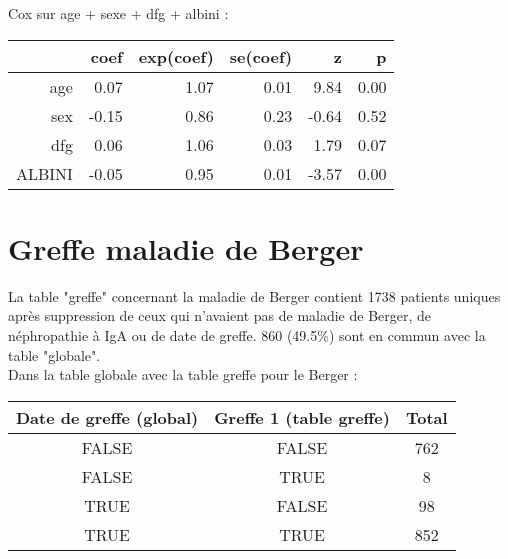 \documentclass[11pt,a4paper]{article}\usepackage[]{graphicx}\usepackage[]{color}
\begin{document}
Cox sur age + sexe + dfg + albini :
\begin{table}[H]
\centering
\begin{tabular}{rrrrrr}
  \hline
 & coef & exp(coef) & se(coef) & z & p \\ 
  \hline
age & 0.07 & 1.07 & 0.01 & 9.84 & 0.00 \\ 
  sex & -0.15 & 0.86 & 0.23 & -0.64 & 0.52 \\ 
  dfg & 0.06 & 1.06 & 0.03 & 1.79 & 0.07 \\ 
  ALBINI & -0.05 & 0.95 & 0.01 & -3.57 & 0.00 \\ 
   \hline
\end{tabular}
\end{table}


  
\section{Greffe maladie de Berger}




La table "greffe" concernant la maladie de Berger contient 1738 patients uniques après suppression de ceux qui n'avaient pas de maladie de Berger, de néphropathie à IgA ou de date de greffe. 860 (49.5\%) sont en commun avec la table "globale".
~\\

Dans la table globale avec la table greffe pour le Berger :

\begin{table}[H]
\centering
\begin{tabular}{ccc}
  \hline
Date de greffe (global) & Greffe 1 (table greffe) & Total \\ 
  \hline
FALSE & FALSE & 762 \\ 
  FALSE & TRUE & 8 \\ 
  TRUE & FALSE & 98 \\ 
  TRUE & TRUE & 852 \\ 
   \hline
\end{tabular}
\end{table}
\end{document}
